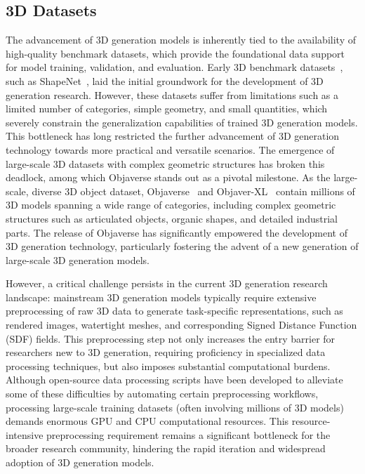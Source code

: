 \documentclass{article} %
\begin{document}

\subsection{3D Datasets}
The advancement of 3D generation models is inherently tied to the availability of high-quality benchmark datasets, which provide the foundational data support for model training, validation, and evaluation. Early 3D benchmark datasets~\cite{zhou2016thingi10k,fu20213d,downs2022google,wu2023omniobject3d}, such as ShapeNet~\cite{chang2015shapenet}, laid the initial groundwork for the development of 3D generation research. However, these datasets suffer from limitations such as a limited number of categories, simple geometry, and small quantities, which severely constrain the generalization capabilities of trained 3D generation models. This bottleneck has long restricted the further advancement of 3D generation technology towards more practical and versatile scenarios. The emergence of large-scale 3D datasets with complex geometric structures has broken this deadlock, among which Objaverse stands out as a pivotal milestone. As the large-scale, diverse 3D object dataset, Objaverse~\cite{objaverse} and Objaver-XL~\cite{objaverseXL} contain millions of 3D models spanning a wide range of categories, including complex geometric structures such as articulated objects, organic shapes, and detailed industrial parts. The release of Objaverse has significantly empowered the development of 3D generation technology, particularly fostering the advent of a new generation of large-scale 3D generation models. 


However, a critical challenge persists in the current 3D generation research landscape: mainstream 3D generation models typically require extensive preprocessing of raw 3D data to generate task-specific representations, such as rendered images, watertight meshes, and corresponding Signed Distance Function (SDF) fields. This preprocessing step not only increases the entry barrier for researchers new to 3D generation, requiring proficiency in specialized data processing techniques, but also imposes substantial computational burdens. Although open-source data processing scripts have been developed to alleviate some of these difficulties by automating certain preprocessing workflows, processing large-scale training datasets (often involving millions of 3D models) demands enormous GPU and CPU computational resources. This resource-intensive preprocessing requirement remains a significant bottleneck for the broader research community, hindering the rapid iteration and widespread adoption of 3D generation models.
\end{document}

